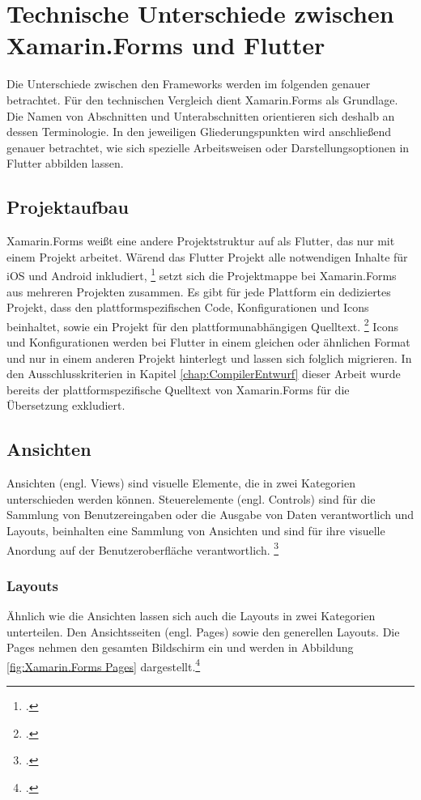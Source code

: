 \chapter{Technische Unterschiede zwischen Xamarin.Forms und Flutter}
\label{chap:CrossPlattformFrameworks}

Die Unterschiede zwischen den Frameworks werden im folgenden genauer betrachtet.  Für den technischen Vergleich dient Xamarin.Forms als Grundlage.  Die Namen von Abschnitten und Unterabschnitten orientieren sich deshalb an dessen Terminologie.  In den jeweiligen Gliederungspunkten wird anschließend genauer betrachtet,  wie sich spezielle Arbeitsweisen oder Darstellungsoptionen in Flutter abbilden lassen. 

\section{Projektaufbau}
Xamarin.Forms weißt eine andere Projektstruktur auf als Flutter,  das nur mit einem Projekt arbeitet.  Wärend das Flutter Projekt alle notwendigen Inhalte für iOS und Android inkludiert, \footcite[Vgl.][S. 113]{Biessek2019} setzt sich die Projektmappe bei Xamarin.Forms aus mehreren Projekten zusammen.  Es gibt für jede Plattform ein dediziertes Projekt, dass den plattformspezifischen Code,  Konfigurationen und Icons beinhaltet, sowie ein Projekt für den plattformunabhängigen Quelltext.   \footcite[Vgl.][S. 25f.]{Petzold2016} Icons und Konfigurationen werden bei Flutter in einem gleichen oder ähnlichen Format und nur in einem anderen Projekt hinterlegt und lassen sich folglich migrieren.  In den Ausschlusskriterien in Kapitel \ref{chap:CompilerEntwurf} dieser Arbeit wurde bereits der plattformspezifische Quelltext von Xamarin.Forms für die Übersetzung exkludiert.  
\section{Ansichten}
Ansichten (engl. Views) sind visuelle Elemente, die in zwei Kategorien unterschieden werden können.  Steuerelemente (engl. Controls) sind für die Sammlung von Benutzereingaben oder die Ausgabe von Daten verantwortlich und Layouts, beinhalten eine Sammlung von Ansichten und sind für ihre visuelle Anordung auf der Benutzeroberfläche verantwortlich.  \footcite[Vgl.][Abgerufen am \today]{Ritscher2020}

\subsection{Layouts}
Ähnlich wie die Ansichten lassen sich auch die Layouts in zwei Kategorien unterteilen.  Den Ansichtsseiten (engl. Pages) sowie den generellen Layouts. 
Die Pages nehmen den gesamten Bildschirm ein und werden in Abbildung \ref{fig:Xamarin.Forms Pages} dargestellt.\footcite[Vgl.][Abgerufen am \today]{MicrosoftXamPages2016}  

